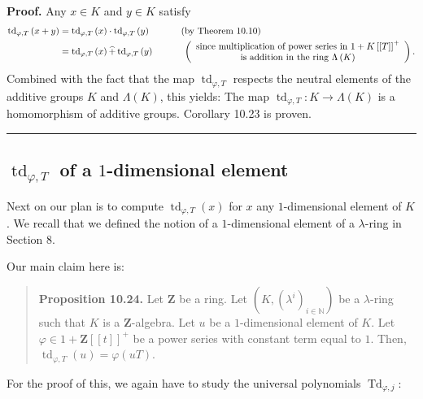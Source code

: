 \documentclass[numbers=enddot,12pt,final,onecolumn,notitlepage]{scrartcl}%
\newenvironment{proof}[1][Proof]{\noindent\textbf{#1.} }{\ \rule{0.5em}{0.5em}}
\begin{document}
\begin{proof}
Any $x\in K$ and $y\in K$ satisfy%
\begin{align*}
\operatorname*{td}\nolimits_{\varphi,T}\left(  x+y\right)   &
=\operatorname*{td}\nolimits_{\varphi,T}\left(  x\right)  \cdot
\operatorname*{td}\nolimits_{\varphi,T}\left(  y\right)
\ \ \ \ \ \ \ \ \ \ \left(  \text{by Theorem 10.10}\right) \\
&  =\operatorname*{td}\nolimits_{\varphi,T}\left(  x\right)  \widehat{+}%
\operatorname*{td}\nolimits_{\varphi,T}\left(  y\right)
\ \ \ \ \ \ \ \ \ \ \left(
\begin{array}
[c]{c}%
\text{since multiplication of power series in }1+K\left[  \left[  T\right]
\right]  ^{+}\\
\text{is addition in the ring }\Lambda\left(  K\right)
\end{array}
\right)  .
\end{align*}
Combined with the fact that the map $\operatorname*{td}\nolimits_{\varphi,T}$
respects the neutral elements of the additive groups $K$ and $\Lambda\left(
K\right)  $, this yields: The map $\operatorname*{td}_{\varphi,T}%
:K\rightarrow\Lambda\left(  K\right)  $ is a homomorphism of additive groups.
Corollary 10.23 is proven.
\end{proof}

\subsection{ $\operatorname*{td}_{\varphi,T}$ of a $1$-dimensional element}

Next on our plan is to compute $\operatorname*{td}\nolimits_{\varphi,T}\left(
x\right)  $ for $x$ any $1$-dimensional element of $K$. We recall that we
defined the notion of a $1$-dimensional element of a $\lambda$-ring in Section 8.

Our main claim here is:

\begin{quote}
\textbf{Proposition 10.24.} Let $\mathbf{Z}$ be a ring. Let $\left(  K,\left(
\lambda^{i}\right)  _{i\in\mathbb{N}}\right)  $ be a $\lambda$-ring such that
$K$ is a $\mathbf{Z}$-algebra. Let $u$ be a $1$-dimensional element of $K$.
Let $\varphi\in1+\mathbf{Z}\left[  \left[  t\right]  \right]  ^{+}$ be a power
series with constant term equal to $1$. Then, $\operatorname*{td}%
\nolimits_{\varphi,T}\left(  u\right)  =\varphi\left(  uT\right)  $.
\end{quote}

For the proof of this, we again have to study the universal polynomials
$\operatorname*{Td}\nolimits_{\varphi,j}$:
\end{document}
